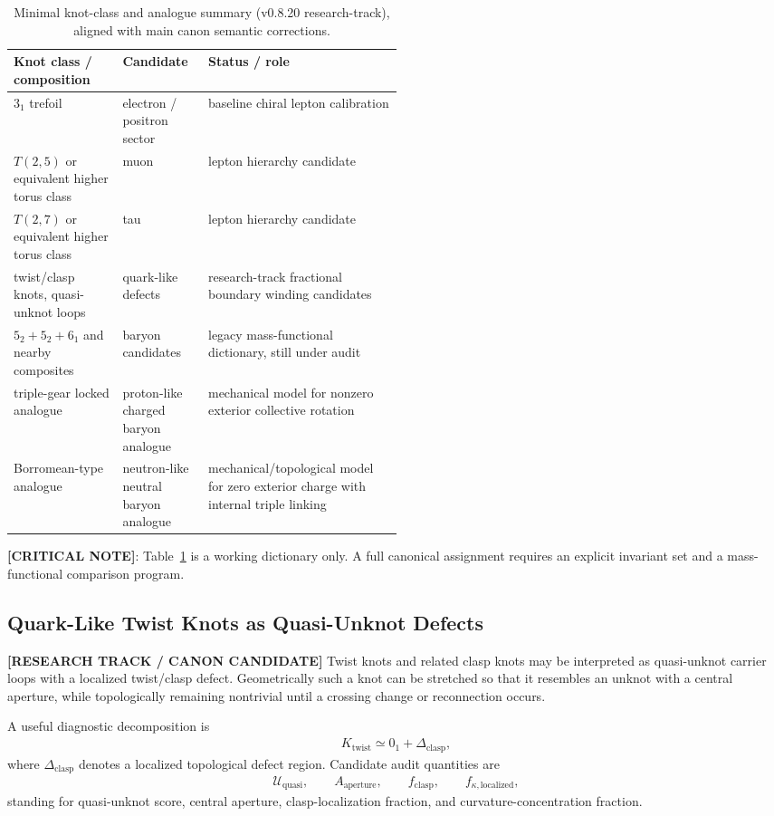 \begin{table}[h]
\centering
\begin{tabularx}{\linewidth}{p{0.28\linewidth}p{0.22\linewidth}X}
\hline
Knot class / composition & Candidate & Status / role \\
\hline
$3_1$ trefoil & electron / positron sector & baseline chiral lepton calibration \\
$T(2,5)$ or equivalent higher torus class & muon & lepton hierarchy candidate \\
$T(2,7)$ or equivalent higher torus class & tau & lepton hierarchy candidate \\
twist/clasp knots, quasi-unknot loops & quark-like defects & research-track fractional boundary winding candidates \\
$5_2+5_2+6_1$ and nearby composites & baryon candidates & legacy mass-functional dictionary, still under audit \\
triple-gear locked analogue & proton-like charged baryon analogue & mechanical model for nonzero exterior collective rotation \\
Borromean-type analogue & neutron-like neutral baryon analogue & mechanical/topological model for zero exterior charge with internal triple linking \\
\hline
\end{tabularx}
\caption{Minimal knot-class and analogue summary (v0.8.20 research-track), aligned with main canon semantic corrections.}
\label{tab:particle-candidates}
\end{table}

\textbf{[CRITICAL NOTE]}: Table~\ref{tab:particle-candidates} is a working dictionary only. A full canonical assignment requires an explicit invariant set and a mass-functional comparison program.


\subsection{Quark-Like Twist Knots as Quasi-Unknot Defects}
\label{subsec:rt_quark_twist_quasi_unknot}

\textbf{[RESEARCH TRACK / CANON CANDIDATE]} Twist knots and related clasp knots may be interpreted as quasi-unknot carrier loops with a localized twist/clasp defect. Geometrically such a knot can be stretched so that it resembles an unknot with a central aperture, while topologically remaining nontrivial until a crossing change or reconnection occurs.

A useful diagnostic decomposition is
\begin{align}
    K_{\mathrm{twist}}
    \simeq
    0_1 + \Delta_{\mathrm{clasp}},
\end{align}
where $\Delta_{\mathrm{clasp}}$ denotes a localized topological defect region. Candidate audit quantities are
\begin{align}
    \mathcal{U}_{\mathrm{quasi}},\qquad
    A_{\mathrm{aperture}},\qquad
    f_{\mathrm{clasp}},\qquad
    f_{\kappa,\mathrm{localized}},
\end{align}
standing for quasi-unknot score, central aperture, clasp-localization fraction, and curvature-concentration fraction.

